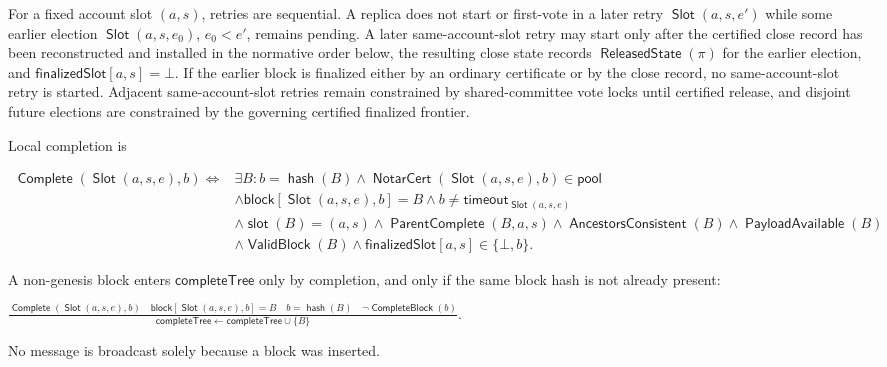 \documentclass[sigplan,twocolumn,review,anonymous]{acmart}
\newcommand{\func}[1]{\operatorname{\mathsf{#1}}}
\newcommand{\hash}{\func{hash}}
\newcommand{\NotarCert}{\func{NotarCert}}
\newcommand{\Slot}{\func{Slot}}
\newcommand{\CompleteBlock}{\func{CompleteBlock}}
\newcommand{\ParentComplete}{\func{ParentComplete}}
\newcommand{\Complete}{\func{Complete}}
\newcommand{\timeoutVal}{\mathsf{timeout}}
\newcommand{\completeTree}{\mathsf{completeTree}}
\newcommand{\blockMap}{\mathsf{block}}
\newcommand{\PayloadAvailable}{\func{PayloadAvailable}}
\newcommand{\ValidBlock}{\func{ValidBlock}}
\newcommand{\slotOf}{\func{slot}}
\newcommand{\finalizedSlot}{\mathsf{finalizedSlot}}
\newcommand{\ReleasedState}{\func{ReleasedState}}
\begin{document}
For a fixed account slot \((a,s)\), retries are sequential.  A replica does not start or first-vote in a later
retry \(\Slot(a,s,e')\) while some earlier election \(\Slot(a,s,e_0)\), \(e_0<e'\), remains pending.
A later same-account-slot retry may start only after the certified close record has been reconstructed and installed in the
normative order below, the resulting close state records \(\ReleasedState(\pi)\) for the earlier
election, and \(\finalizedSlot[a,s]=\bot\).  If the earlier block is finalized either by an ordinary
certificate or by the close record, no same-account-slot retry is started.  Adjacent same-account-slot retries remain
constrained by shared-committee vote locks until certified release, and disjoint future elections are
constrained by the governing certified finalized frontier.

Local completion is
\begin{center}
\begin{adjustbox}{max width=\columnwidth}
\(\displaystyle
\begin{aligned}
\Complete(\Slot(a,s,e),b)
\iff{}& \exists B:b=\hash(B)\wedge\NotarCert(\Slot(a,s,e),b)\in\mathsf{pool}\\
&\wedge\blockMap[\Slot(a,s,e),b]=B\wedge b\neq\timeoutVal_{\Slot(a,s,e)}\\
&\wedge\slotOf(B)=(a,s)\wedge\ParentComplete(B,a,s)\wedge\func{AncestorsConsistent}(B)\wedge\PayloadAvailable(B)\\
&\wedge\ValidBlock(B)\wedge\finalizedSlot[a,s]\in\{\bot,b\}.
\end{aligned}
\)
\end{adjustbox}
\end{center}
A non-genesis block enters \(\completeTree\) only by completion, and only if the same block
hash is not already present:
\begin{center}
\begin{adjustbox}{max width=\columnwidth}
\(\displaystyle
\frac{\Complete(\Slot(a,s,e),b)\quad\blockMap[\Slot(a,s,e),b]=B\quad b=\hash(B)\quad\neg\CompleteBlock(b)}
{\completeTree\gets\completeTree\cup\{B\}}.
\)
\end{adjustbox}
\end{center}
No message is broadcast solely because a block was inserted.
\end{document}
